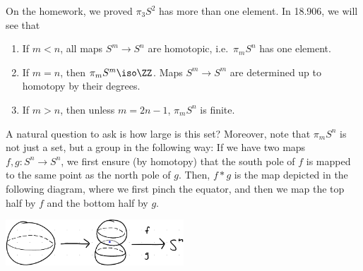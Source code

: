 \documentclass{standalone}
\begin{document}
On the homework, we proved \(\pi_3 S^2\) has more than one element.
In 18.906, we will see that
\begin{enumerate}
  \item If \(m < n\), all maps \(S^m \to S^n\) are homotopic,
        i.e.\ \(\pi_m S^n\) has one element.
  \item If \(m = n\), then \(\pi_m S^m \iso \ZZ\).
        Maps \(S^m \to S^m\) are determined up to homotopy by their degrees.
  \item If \(m > n\), then unless \(m = 2n - 1\), \(\pi_m S^n\) is finite.
\end{enumerate}
A natural question to ask is how large is this set?
Moreover, note that \(\pi_m S^n\) is not just a set,
but a group in the following way:
If we have two maps \(f, g \colon S^n \to S^n\),
we first ensure (by homotopy) that the south pole of \(f\)
is mapped to the same point as the north pole of \(g\).
Then, \(f * g\) is the map depicted in the following diagram,
where we first pinch the equator,
and then we map the top half by \(f\) and the bottom half by \(g\).
\begin{center}
  \includegraphics[width=0.5\textwidth]{18_905-201207-5.png}
\end{center}
\end{document}

